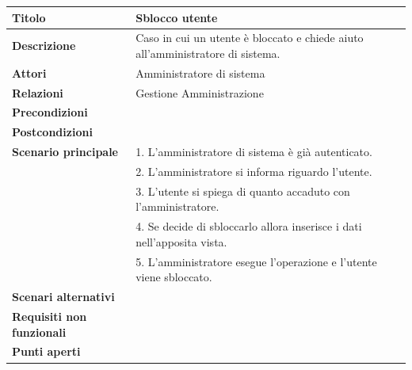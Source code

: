 \documentclass[a4paper]{article}
\begin{document}
\begin{center}
    \begin{tabularx}{1\textwidth}{|l|X|}
        \hline
        \textbf{Titolo} & Sblocco utente \\
        \hline
        \textbf{Descrizione} & Caso in cui un utente è bloccato e chiede aiuto all'amministratore di sistema. \\
        \hline
        \textbf{Attori} & Amministratore di sistema \\
        \hline
        \textbf{Relazioni} & Gestione Amministrazione \\
        \hline
        \textbf{Precondizioni} &  \\
        \hline
        \textbf{Postcondizioni} &  \\
        \hline
        \textbf{Scenario principale} & 1. L'amministratore di sistema è già autenticato.\\
                                     & 2. L'amministratore si informa riguardo l'utente.\\
                                     & 3. L'utente si spiega di quanto accaduto con l'amministratore.\\
                                     & 4. Se decide di sbloccarlo allora inserisce i dati nell'apposita vista.\\
                                     & 5. L'amministratore esegue l'operazione e l'utente viene sbloccato.\\
        \hline
        \textbf{Scenari alternativi} & \\
        \hline
        \textbf{Requisiti non funzionali} & \\
        \hline
        \textbf{Punti aperti} & \\
        \hline
    \end{tabularx}
\end{center}

\end{document}
